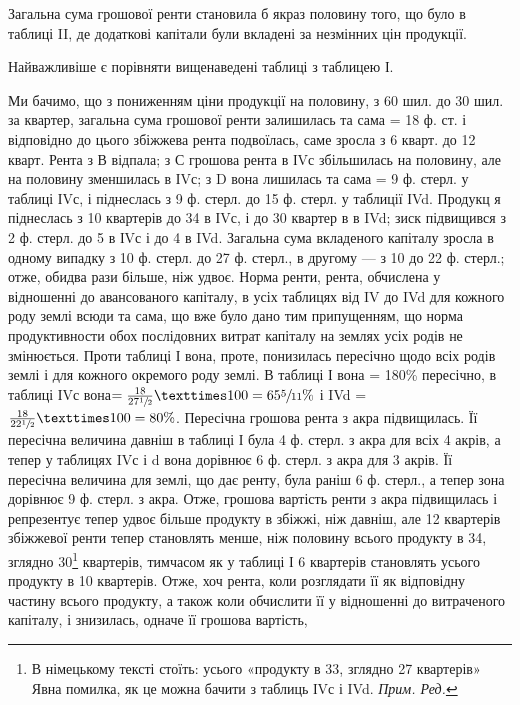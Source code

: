
Загальна сума грошової ренти становила б якраз половину того, що було
в таблиці II, де додаткові капітали були вкладені за незмінних цін продукції.

Найважливіше є порівняти вищенаведені таблиці з таблицею І.

Ми бачимо, що з пониженням ціни продукції на половину, з 60 шил. до
30 шил. за квартер, загальна сума грошової ренти залишилась та сама = 18 ф.
ст. і відповідно до цього збіжжева рента подвоїлась, саме зросла з 6 кварт. до
12 кварт. Рента з В відпала; з С грошова рента в ІVс збільшилась на половину,
але на половину зменшилась в ІVс; з D вона лишилась та сама = 9 ф.
стерл. у таблиці ІVс, і піднеслась з 9 ф. стерл. до 15 ф. стерл. у таблиції ІVd.
Продукц я піднеслась з 10 квартерів до 34 в ІVс, і до 30 квартер в в IVd;
зиск підвищився з 2 ф. стерл. до 5 в ІVс і до 4  в IVd. Загальна сума
вкладеного капіталу зросла в одному випадку з 10 ф. стерл. до 27 ф. стерл.,
в другому — з 10 до 22 ф. стерл.; отже, обидва рази більше, ніж удвоє. Норма
ренти, рента, обчислена у відношенні до авансованого капіталу, в усіх таблицях
від IV до IVd для кожного роду землі всюди та сама, що вже було дано тим припущенням,
що норма продуктивности обох послідовних витрат капіталу на землях
усіх родів не змінюється. Проти таблиці І вона, проте, понизилась пересічно
щодо всіх родів землі і для кожного окремого роду землі. В таблиці І вона =
180\% пересічно, в таблиці ІVс вона$ = \frac{18}{27\sfrac{1}{2}} × 100 = 65\sfrac{5}{11}\%$ і
IVd = $\frac{18}{22\sfrac{1}{2}} × 100 = 80\%$. Пересічна грошова рента з акра підвищилась. Її пересічна
величина давніш в таблиці І була 4 ф. стерл. з акра для всіх 4 акрів,
а тепер у таблицях IVс і d вона дорівнює 6 ф. стерл. з акра для 3 акрів.
Її пересічна величина для землі, що дає ренту, була раніш 6 ф. стерл., а тепер
зона дорівнює 9 ф. стерл. з акра. Отже, грошова вартість ренти з акра підвищилась
і репрезентує тепер удвоє більше продукту в збіжжі, ніж давніш, але
12 квартерів збіжжевої ренти тепер становлять менше, ніж половину всього продукту
в 34, зглядно 30\footnote*{В німецькому тексті стоїть: усього «продукту в 33, зглядно 27 квартерів» Явна помилка,
як це можна бачити з таблиць ІVс і IVd. \emph{Прим. Ред.}} квартерів, тимчасом як у таблиці І 6 квартерів становлять
  усього продукту в 10 квартерів. Отже, хоч рента, коли розглядати
її як відповідну частину всього продукту, а також коли обчислити її у відношенні
до витраченого капіталу, і знизилась, одначе її грошова вартість,
